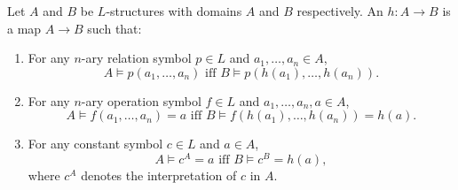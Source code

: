 Let $A$ and $B$ be $L$-structures with domains $A$ and $B$ respectively. An  $h : A \rightarrow B$ is a map $A \rightarrow B$ such that:

\begin{enumerate}
\item For any $n$-ary relation symbol $p \in L$ and $a_1, \ldots, a_n \in A$,
$$A \vDash p(a_1, \ldots, a_n) \text{ iff } B \vDash p(h(a_1), \ldots, h(a_n)).$$

\item For any $n$-ary operation symbol $f \in L$ and $a_1, \ldots, a_n, a \in A$,
$$A \vDash f(a_1, \ldots, a_n) = a \text{ iff } B \vDash f(h(a_1), \ldots, h(a_n)) = h(a).$$

\item For any constant symbol $c \in L$ and $a \in A$,
$$A \vDash c^A = a \text{ iff } B \vDash c^B = h(a),$$
where $c^A$ denotes the interpretation of $c$ in $A$.
\end{enumerate}

